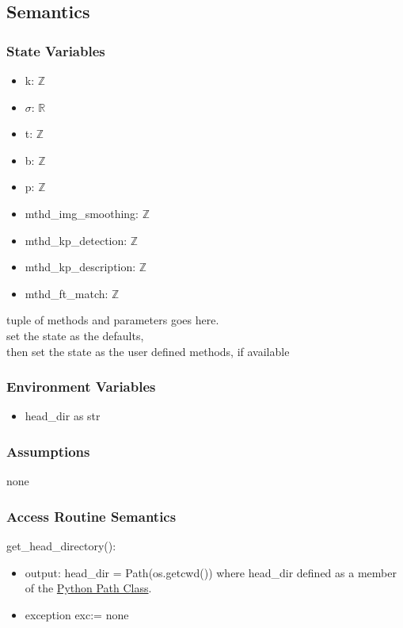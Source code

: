 \documentclass[12pt, titlepage]{article}
\begin{document}
\subsection{Semantics}

\subsubsection{State Variables}
\begin{itemize}
  \item k: $\mathbb{Z}$
  \item $\sigma$: $\mathbb{R}$
  \item t: $\mathbb{Z}$
  \item b: $\mathbb{Z}$
  \item p: $\mathbb{Z}$
  \item mthd\_img\_smoothing: $\mathbb{Z}$
  \item mthd\_kp\_detection: $\mathbb{Z}$
  \item mthd\_kp\_description: $\mathbb{Z}$
  \item mthd\_ft\_match: $\mathbb{Z}$
\end{itemize}

tuple of methods and parameters goes here.\\
set the state as the defaults, \\
then set the state as the user defined methods, if available


\subsubsection{Environment Variables}
\begin{itemize}
  \item head\_dir as str
\end{itemize}

\subsubsection{Assumptions}
none 

\subsubsection{Access Routine Semantics}
\noindent get\_head\_directory():
\begin{itemize}
  \item output: head\_dir = Path(os.getcwd()) where head\_dir defined as 
  a member of the \href{https://docs.python.org/3/library/os.path.html}{Python Path Class}.
  \item exception exc:= none
\end{itemize}
\end{document}
